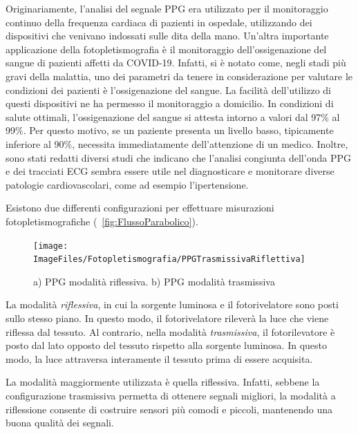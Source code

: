 Originariamente, l'analisi del segnale PPG era utilizzato per il monitoraggio continuo della frequenza cardiaca di pazienti in ospedale, utilizzando dei dispositivi che venivano indossati sulle dita della mano. Un'altra importante applicazione della fotopletismografia è il monitoraggio dell'ossigenazione del sangue di pazienti affetti da COVID-19. Infatti, si è notato come, negli stadi più gravi della malattia, uno dei parametri da tenere in considerazione per valutare le condizioni dei pazienti è l'ossigenazione del sangue. La facilità dell'utilizzo di questi dispositivi ne ha permesso il monitoraggio a domicilio. In condizioni di salute ottimali, l'ossigenazione del sangue si attesta intorno a valori dal 97\% al 99\%. Per questo motivo, se un paziente presenta un livello basso, tipicamente inferiore al 90\%, necessita immediatamente dell'attenzione di un medico. Inoltre, sono stati redatti diversi studi che indicano che l'analisi congiunta dell'onda PPG e dei tracciati ECG sembra essere utile nel diagnosticare e monitorare diverse patologie cardiovascolari, come ad esempio l'ipertensione\cite{Elgendi2019}. 

Esistono due differenti configurazioni per effettuare misurazioni fotopletismografiche (\Fig~\ref{fig:FlussoParabolico}).
\begin{figure}[h]
	\centering
	\texttt{[image: ImageFiles/Fotopletismografia/PPGTrasmissivaRiflettiva]}
	\caption{a) PPG modalità riflessiva. b) PPG modalità trasmissiva}
	\label{fig:PPGTrasmissivaRiflettiva}
\end{figure}

La modalità \textit{riflessiva}, in cui la sorgente luminosa e il fotorivelatore sono posti sullo stesso piano. In questo modo, il fotorivelatore rileverà la luce che viene riflessa dal tessuto. Al contrario, nella modalità \textit{trasmissiva}, il fotorilevatore è posto dal lato opposto del tessuto rispetto alla sorgente luminosa. In questo modo, la luce attraversa interamente il tessuto prima di essere acquisita. 

La modalità maggiormente utilizzata è quella riflessiva.  Infatti, sebbene la configurazione trasmissiva permetta di ottenere segnali migliori, la modalità a riflessione consente di costruire sensori più comodi e piccoli, mantenendo una buona qualità dei segnali.


